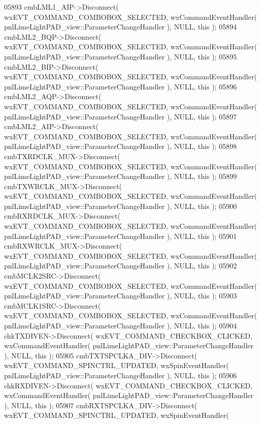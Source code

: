 \begin{DoxyCode}
05893     cmbLML1_AIP->Disconnect( wxEVT\_COMMAND\_COMBOBOX\_SELECTED, wxCommandEventHandler( 
      pnlLimeLightPAD_view::ParameterChangeHandler ), NULL, \textcolor{keyword}{this} );
05894     cmbLML2_BQP->Disconnect( wxEVT\_COMMAND\_COMBOBOX\_SELECTED, wxCommandEventHandler( 
      pnlLimeLightPAD_view::ParameterChangeHandler ), NULL, \textcolor{keyword}{this} );
05895     cmbLML2_BIP->Disconnect( wxEVT\_COMMAND\_COMBOBOX\_SELECTED, wxCommandEventHandler( 
      pnlLimeLightPAD_view::ParameterChangeHandler ), NULL, \textcolor{keyword}{this} );
05896     cmbLML2_AQP->Disconnect( wxEVT\_COMMAND\_COMBOBOX\_SELECTED, wxCommandEventHandler( 
      pnlLimeLightPAD_view::ParameterChangeHandler ), NULL, \textcolor{keyword}{this} );
05897     cmbLML2_AIP->Disconnect( wxEVT\_COMMAND\_COMBOBOX\_SELECTED, wxCommandEventHandler( 
      pnlLimeLightPAD_view::ParameterChangeHandler ), NULL, \textcolor{keyword}{this} );
05898     cmbTXRDCLK_MUX->Disconnect( wxEVT\_COMMAND\_COMBOBOX\_SELECTED, wxCommandEventHandler( 
      pnlLimeLightPAD_view::ParameterChangeHandler ), NULL, \textcolor{keyword}{this} );
05899     cmbTXWRCLK_MUX->Disconnect( wxEVT\_COMMAND\_COMBOBOX\_SELECTED, wxCommandEventHandler( 
      pnlLimeLightPAD_view::ParameterChangeHandler ), NULL, \textcolor{keyword}{this} );
05900     cmbRXRDCLK_MUX->Disconnect( wxEVT\_COMMAND\_COMBOBOX\_SELECTED, wxCommandEventHandler( 
      pnlLimeLightPAD_view::ParameterChangeHandler ), NULL, \textcolor{keyword}{this} );
05901     cmbRXWRCLK_MUX->Disconnect( wxEVT\_COMMAND\_COMBOBOX\_SELECTED, wxCommandEventHandler( 
      pnlLimeLightPAD_view::ParameterChangeHandler ), NULL, \textcolor{keyword}{this} );
05902     cmbMCLK2SRC->Disconnect( wxEVT\_COMMAND\_COMBOBOX\_SELECTED, wxCommandEventHandler( 
      pnlLimeLightPAD_view::ParameterChangeHandler ), NULL, \textcolor{keyword}{this} );
05903     cmbMCLK1SRC->Disconnect( wxEVT\_COMMAND\_COMBOBOX\_SELECTED, wxCommandEventHandler( 
      pnlLimeLightPAD_view::ParameterChangeHandler ), NULL, \textcolor{keyword}{this} );
05904     chkTXDIVEN->Disconnect( wxEVT\_COMMAND\_CHECKBOX\_CLICKED, wxCommandEventHandler( 
      pnlLimeLightPAD_view::ParameterChangeHandler ), NULL, \textcolor{keyword}{this} );
05905     cmbTXTSPCLKA_DIV->Disconnect( wxEVT\_COMMAND\_SPINCTRL\_UPDATED, wxSpinEventHandler( 
      pnlLimeLightPAD_view::ParameterChangeHandler ), NULL, \textcolor{keyword}{this} );
05906     chkRXDIVEN->Disconnect( wxEVT\_COMMAND\_CHECKBOX\_CLICKED, wxCommandEventHandler( 
      pnlLimeLightPAD_view::ParameterChangeHandler ), NULL, \textcolor{keyword}{this} );
05907     cmbRXTSPCLKA_DIV->Disconnect( wxEVT\_COMMAND\_SPINCTRL\_UPDATED, wxSpinEventHandler( 

\end{DoxyCode}
